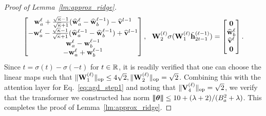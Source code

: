 \begin{proof}[Proof of Lemma~\ref{lm:approx_ridge}]
\begin{align*}
\begin{bmatrix}
        {\mathbf w}^{\ell}_a+\frac{\sqrt{\kappa}-1}{\sqrt{\kappa}+1}(\widehat{{\mathbf w}}^{\ell}_a-\widehat{{\mathbf w}}^{\ell-1}_b)-\widehat{{\mathbf v}}^{l-1}
        \\
        -{\mathbf w}^{\ell}_a-\frac{\sqrt{\kappa}-1}{\sqrt{\kappa}+1}(\widehat{{\mathbf w}}^{\ell-1}_a-\widehat{{\mathbf w}}^{\ell-1}_b)+\widehat{{\mathbf v}}^{l-1}
        \\
        {\mathbf w}^{\ell}_a- {\mathbf w}^{\ell-1}_b
        \\
        -{\mathbf w}^{\ell}_a+{\mathbf w}^{\ell-1}_b
    \end{bmatrix},~~ {\mathbf W}_2^{(\ell)}\sigma({\mathbf W}_1^{(\ell)}\tilde{{\mathbf h}}^{(\ell-1)}_{2t-1})=\begin{bmatrix}
      {\mathbf 0}\\  \widehat{{\mathbf w}}^{\ell}_b \\ \widehat{{\mathbf v}}^\ell\\{\mathbf 0}
    \end{bmatrix}.
\end{align*} Since $t=\sigma(t)-\sigma(-t)$ for $t\in\mathbb{R}$,  it is readily verified that one can choose the linear maps such that $\|{{\mathbf W}_1^{(\ell)}}\|_{\mathrm{op}}\leq 4\sqrt{2},\|{{\mathbf W}_2^{(\ell)}}\|_{\mathrm{op}}=\sqrt{2}$. Combining this with the attention layer for Eq.~\eqref{eq:agd_step1} and noting that $\|{{\mathbf V}_4^{(\ell)}}\|_{\mathrm{op}}=\sqrt{2}$, we verify that the  transformer we constructed has norm ${\left|\!\left|\!\left|{{\boldsymbol \theta}}\right|\!\right|\!\right|}\leq 10+(\lambda+2)/(B_a^2+\lambda)$. This completes the proof of Lemma~\ref{lm:approx_ridge}.
\end{proof}














